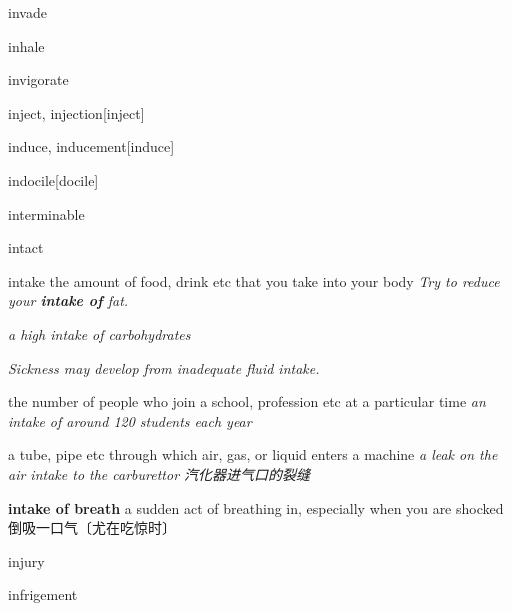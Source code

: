 \begin{RefWord}{invade}
\end{RefWord}

\begin{RefWord}{inhale}
\end{RefWord}

\begin{RefWord}{invigorate}
\end{RefWord}

\begin{RefWord}{inject, injection}[inject]
\end{RefWord}

\begin{RefWord}{induce, inducement}[induce]
\end{RefWord}

\begin{RefWord}{indocile}[docile]
\end{RefWord}

\begin{RefWord}{interminable}
\end{RefWord}

\begin{RefWord}{intact}
\end{RefWord}

\begin{RefWord}{intake}
    the amount of food, drink etc that you take into your body
    \textit{Try to reduce your \textbf{intake of} fat.}

    \textit{a high intake of carbohydrates}

    \textit{Sickness may develop from inadequate fluid intake.}

    the number of people who join a school, profession etc at a particular time
    \textit{an intake of around 120 students each year}

    a tube, pipe etc through which air, gas, or liquid enters a machine
    \textit{a leak on the air intake to the carburettor 汽化器进气口的裂缝}

    \textbf{intake of breath} a sudden act of breathing in, especially when you are shocked倒吸一口气〔尤在吃惊时〕
\end{RefWord}

\begin{RefWord}{injury}
\end{RefWord}

\begin{RefWord}{infrigement}
\end{RefWord}

